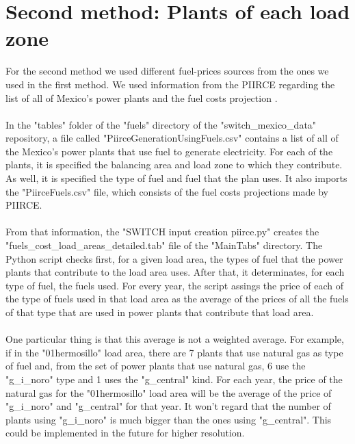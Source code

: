 \documentclass{article}
\begin{document}
\section{Second method: Plants of each load zone}
For the second method we used different fuel-prices sources from the ones we used in the first method. We used information from the PIIRCE regarding the list of all of Mexico's power plants\cite{piirceg} and the fuel costs projection \cite{piircef}.
\\
\\In the "tables" folder of the "fuels" directory of the "switch\_mexico\_data" repository, a file called "PiirceGenerationUsingFuels.csv" contains a list of all of the Mexico's power plants that use fuel to generate electricity. For each of the plants, it is specified the balancing area and load zone to which they contribute. As well, it is specified the type of fuel and fuel that the plan uses. It also imports the "PiirceFuels.csv" file, which consists of the fuel costs projections made by PIIRCE\cite{piircef}.
\\
\\From that information, the "SWITCH input creation piirce.py" creates the "fuels\_cost\_load\_areas\_detailed.tab" file of the "MainTabs" directory. The Python script checks first, for a given load area, the types of fuel that the power plants that contribute to the load area uses. After that, it determinates, for each type of fuel, the fuels used. For every year, the script assings the price of each of the type of fuels used in that load area as the average of the prices of all the fuels of that type that are used in power plants that contribute that load area. 
\\
\\One particular thing is that this average is not a weighted average. For example, if in the "01\-hermosillo" load area, there are 7 plants that use natural gas as type of fuel and, from the set of power plants that use natural gas, 6 use the "g\_i\_noro" type and 1 uses the "g\_central"  kind. For each year, the price of the natural gas for the "01\-hermosillo" load area will be the average of the price of "g\_i\_noro" and "g\_central" for that year. It won't regard that the number of plants using "g\_i\_noro" is much bigger than the ones using "g\_central". This could be implemented in the future for higher resolution.
\end{document}
